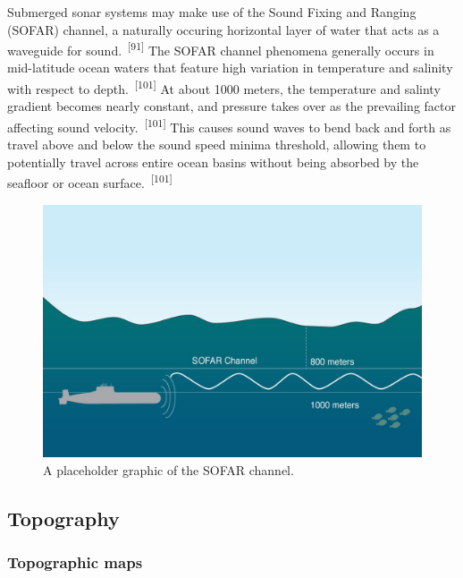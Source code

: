\documentclass{article}
\begin{document}

\par{Submerged sonar systems may make use of the Sound Fixing and Ranging (SOFAR) channel, a naturally occuring horizontal layer of water that acts as a waveguide for sound.~\textsuperscript{[91]} The SOFAR channel phenomena generally occurs in mid-latitude ocean waters that feature high variation in temperature and salinity with respect to depth.~\textsuperscript{[101]} At about 1000 meters, the temperature and salinty gradient becomes nearly constant, and pressure takes over as the prevailing factor affecting sound velocity.~\textsuperscript{[101]} This causes sound waves to bend back and forth as travel above and below the sound speed minima threshold, allowing them to potentially travel across entire ocean basins without being absorbed by the seafloor or ocean surface.~\textsuperscript{[101]}}


\begin{figure}
    \centering
    \includegraphics[width=1.0\linewidth]{images/sofar.jpg}
    \caption{A placeholder graphic of the SOFAR channel.}
    \label{figure27}
\end{figure}

\subsection{Topography}

\subsubsection{Topographic maps}
\end{document}
